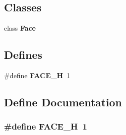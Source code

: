 \subsection*{Classes}
\begin{CompactItemize}
\item 
class {\bf Face}
\end{CompactItemize}
\subsection*{Defines}
\begin{CompactItemize}
\item 
\#define {\bf FACE\_\-H}~1
\end{CompactItemize}


\subsection{Define Documentation}
\subsubsection{\setlength{\rightskip}{0pt plus 5cm}\#define FACE\_\-H~1}\label{face_8h_2d49d7fbff43a8596a37e792a51a6d13}


